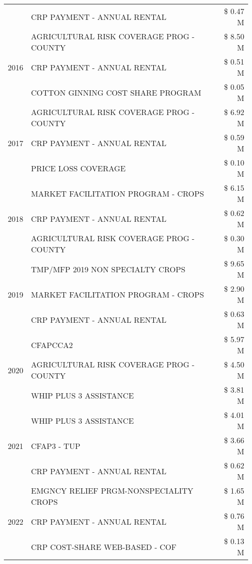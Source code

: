 \begin{tabular}{llr}
 & CRP PAYMENT - ANNUAL RENTAL & \$ 0.47 M \\
\cline{1-3}
\multirow[t]{3}{*}{2016} & AGRICULTURAL RISK COVERAGE PROG - COUNTY & \$ 8.50 M \\
 & CRP PAYMENT - ANNUAL RENTAL & \$ 0.51 M \\
 & COTTON GINNING COST SHARE PROGRAM & \$ 0.05 M \\
\cline{1-3}
\multirow[t]{3}{*}{2017} & AGRICULTURAL RISK COVERAGE PROG - COUNTY & \$ 6.92 M \\
 & CRP PAYMENT - ANNUAL RENTAL & \$ 0.59 M \\
 & PRICE LOSS COVERAGE & \$ 0.10 M \\
\cline{1-3}
\multirow[t]{3}{*}{2018} & MARKET FACILITATION PROGRAM - CROPS & \$ 6.15 M \\
 & CRP PAYMENT - ANNUAL RENTAL & \$ 0.62 M \\
 & AGRICULTURAL RISK COVERAGE PROG - COUNTY & \$ 0.30 M \\
\cline{1-3}
\multirow[t]{3}{*}{2019} & TMP/MFP 2019 NON SPECIALTY CROPS & \$ 9.65 M \\
 & MARKET FACILITATION PROGRAM - CROPS & \$ 2.90 M \\
 & CRP PAYMENT - ANNUAL RENTAL & \$ 0.63 M \\
\cline{1-3}
\multirow[t]{3}{*}{2020} & CFAPCCA2 & \$ 5.97 M \\
 & AGRICULTURAL RISK COVERAGE PROG - COUNTY & \$ 4.50 M \\
 & WHIP PLUS 3 ASSISTANCE & \$ 3.81 M \\
\cline{1-3}
\multirow[t]{3}{*}{2021} & WHIP PLUS 3 ASSISTANCE & \$ 4.01 M \\
 & CFAP3 - TUP & \$ 3.66 M \\
 & CRP PAYMENT - ANNUAL RENTAL & \$ 0.62 M \\
\cline{1-3}
\multirow[t]{3}{*}{2022} & EMGNCY RELIEF PRGM-NONSPECIALITY CROPS & \$ 1.65 M \\
 & CRP PAYMENT - ANNUAL RENTAL & \$ 0.76 M \\
 & CRP COST-SHARE WEB-BASED - COF & \$ 0.13 M \\
\cline{1-3}
\bottomrule
\end{tabular}
